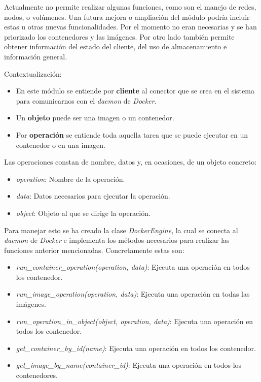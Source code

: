 Actualmente no permite realizar algunas funciones, como son el manejo de redes, nodos, o volúmenes. Una futura mejora o ampliación del módulo podría incluir estas u otras nuevas funcionalidades. Por el momento no eran necesarias y se han priorizado los contenedores y las imágenes. Por otro lado también permite obtener información del estado del cliente, del uso de almacenamiento e información general.

\bigskip
Contextualización:
\begin{itemize}
	\item En este módulo se entiende por \textbf{cliente} al conector que se crea en el sistema para comunicarnos con el \textit{daemon} de \textit{Docker}.
	\item Un \textbf{objeto} puede ser una imagen o un contenedor.
	\item Por \textbf{operación} se entiende toda aquella tarea que se puede ejecutar en un contenedor o en una imagen.
\end{itemize}

\bigskip
Las operaciones constan de nombre, datos y, en ocasiones, de un objeto concreto:
\begin{itemize}
	\item \textit{operation}: Nombre de la operación.
	\item \textit{data}: Datos necesarios para ejecutar la operación.
	\item \textit{object}: Objeto al que se dirige la operación.
\end{itemize}


\bigskip
Para manejar esto se ha creado la clase \textit{DockerEngine}, la cual se conecta al \textit{daemon} de \textit{Docker} e implementa los métodos necesarios para realizar las funciones anterior mencionadas. Concretamente estas son:
\begin{itemize}
	\item \textit{run\_container\_operation(operation, data)}: Ejecuta una operación en todos los contenedor.
	\item \textit{run\_image\_operation(operation, data)}: Ejecuta una operación en todas las imágenes.
	\item \textit{run\_operation\_in\_object(object, operation, data)}: Ejecuta una operación en todos los contenedor.
	\item \textit{get\_container\_by\_id(name)}: Ejecuta una operación en todos los contenedor.
	\item \textit{get\_image\_by\_name(container\_id)}: Ejecuta una operación en todos los contenedores.
\end{itemize}


